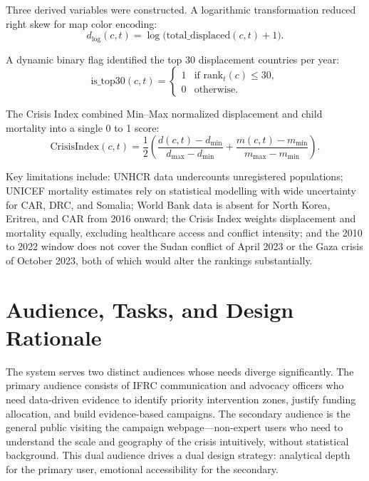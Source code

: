 \documentclass{article}
\begin{document}
Three derived variables were constructed. A logarithmic transformation reduced right skew for map color encoding:
\begin{equation}
d_{\log}(c,t) = \log\bigl(\text{total\_displaced}(c,t) + 1\bigr).
\end{equation}

A dynamic binary flag identified the top 30 displacement countries per year:
\begin{equation}
\text{is\_top30}(c,t) =
\begin{cases}
1 & \text{if } \text{rank}_t(c) \leq 30,\\
0 & \text{otherwise.}
\end{cases}
\end{equation}

The Crisis Index combined Min--Max normalized displacement and child mortality into a single 0 to 1 score:
\begin{equation}
\text{CrisisIndex}(c,t) = \frac{1}{2}\left(
\frac{d(c,t) - d_{\min}}{d_{\max} - d_{\min}}
+ \frac{m(c,t) - m_{\min}}{m_{\max} - m_{\min}}
\right).
\end{equation}

Key limitations include: UNHCR data undercounts unregistered populations; UNICEF mortality estimates rely on statistical modelling with wide uncertainty for CAR, DRC, and Somalia; World Bank data is absent for North Korea, Eritrea, and CAR from 2016 onward; the Crisis Index weights displacement and mortality equally, excluding healthcare access and conflict intensity; and the 2010 to 2022 window does not cover the Sudan conflict of April 2023 or the Gaza crisis of October 2023, both of which would alter the rankings substantially.

\section{Audience, Tasks, and Design Rationale}

The system serves two distinct audiences whose needs diverge significantly. The primary audience consists of IFRC communication and advocacy officers who need data-driven evidence to identify priority intervention zones, justify funding allocation, and build evidence-based campaigns. The secondary audience is the general public visiting the campaign webpage---non-expert users who need to understand the scale and geography of the crisis intuitively, without statistical background. This dual audience drives a dual design strategy: analytical depth for the primary user, emotional accessibility for the secondary.
\end{document}
